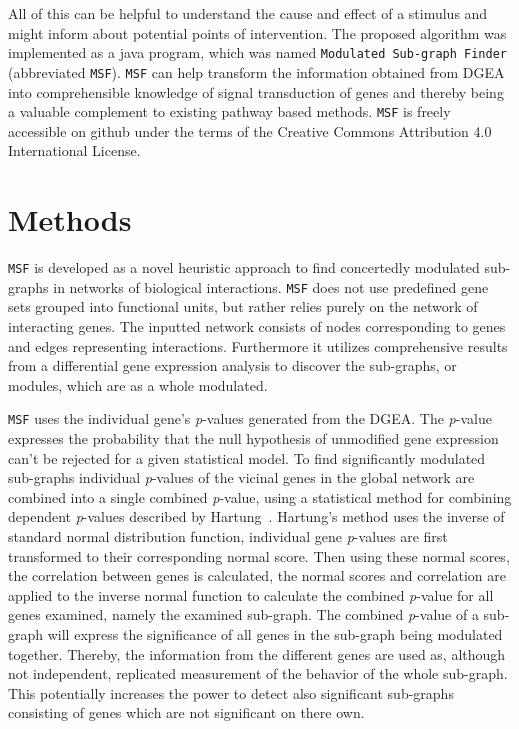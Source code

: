 \documentclass[10pt,a4paper,twocolumn]{article}
\begin{document}
All of this can be helpful to understand the cause and effect of a stimulus
and might inform about potential points of intervention. The proposed
algorithm was implemented as a java program, which was named
\texttt{Modulated Sub-graph Finder} (abbreviated
\texttt{MSF}). \texttt{MSF} can help transform the information obtained
from DGEA into comprehensible knowledge of signal transduction of genes and
thereby being a valuable complement to existing pathway based
methods. \texttt{MSF} is freely accessible on github under the terms of the
Creative Commons Attribution 4.0 International License.

\section*{Methods}
\texttt{MSF} is developed as a novel heuristic approach to find concertedly
modulated sub-graphs in networks of biological interactions.  \texttt{MSF}
does not use predefined gene sets grouped into functional units, but rather
relies purely on the network of interacting genes.  The inputted network
consists of nodes corresponding to genes and edges representing
interactions. Furthermore it utilizes comprehensive results from a
differential gene expression analysis to discover the sub-graphs, or
modules, which are as a whole modulated.

\texttt{MSF} uses the individual gene's \textit{p}-values generated from
the DGEA. The \textit{p}-value expresses the probability that the null
hypothesis of unmodified gene expression can't be rejected for a given
statistical model. To find significantly modulated sub-graphs individual
\textit{p}-values of the vicinal genes in the global network are combined
into a single combined \textit{p}-value, using a statistical method for
combining dependent \textit{p}-values described by
Hartung~\cite{Hartung}. Hartung's method uses the inverse of standard
normal distribution function, individual gene \textit{p}-values are first
transformed to their corresponding normal score. Then using these normal
scores, the correlation between genes is calculated, the normal scores and
correlation are applied to the inverse normal function to calculate the
combined \textit{p}-value for all genes examined, namely the examined
sub-graph. The combined \textit{p}-value of a sub-graph will express the
significance of all genes in the sub-graph being modulated
together. Thereby, the information from the different genes are used as,
although not independent, replicated measurement of the behavior of the
whole sub-graph. This potentially increases the power to detect also
significant sub-graphs consisting of genes which are not significant on
there own.
\newline
\end{document}
